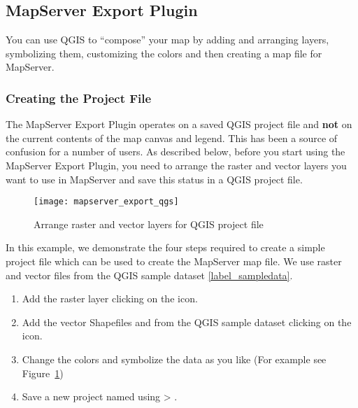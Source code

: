 
\subsection{MapServer Export Plugin}\label{sec:mapserver_export}


You can use QGIS to ``compose'' your map by adding and arranging layers, 
symbolizing them, customizing the colors and then creating a map file 
for MapServer.

\subsubsection{Creating the Project File}

The MapServer Export Plugin operates on a saved QGIS project file and 
\textbf{not} on the current contents of the map canvas and legend. This 
has been a source of confusion for a number of users. As described below, 
before you start using the MapServer Export Plugin, you need to arrange 
the raster and vector layers you want to use in MapServer and save this 
status in a QGIS project file.

\begin{figure}[ht]
\begin{center}
  \caption{Arrange raster and vector layers for QGIS project file \nixcaption}
  \label{fig:mapserver_export_qgs}\smallskip
  \texttt{[image: mapserver\_export\_qgs]}
\end{center}
\end{figure}

In this example, we demonstrate the four steps required to create a simple 
project file which can be used to create the MapServer map file. 
We use raster and vector files from the QGIS sample dataset \ref{label_sampledata}.

\begin{enumerate}
\item Add the raster layer  clicking on the 
 icon.
\item Add the vector Shapefiles  and 
 from the QGIS sample dataset clicking on the 
 icon.
\item Change the colors and symbolize the data as you like (For example see 
Figure~\ref{fig:mapserver_export_qgs})
\item Save a new project named  using 
 > .
\end{enumerate} 

